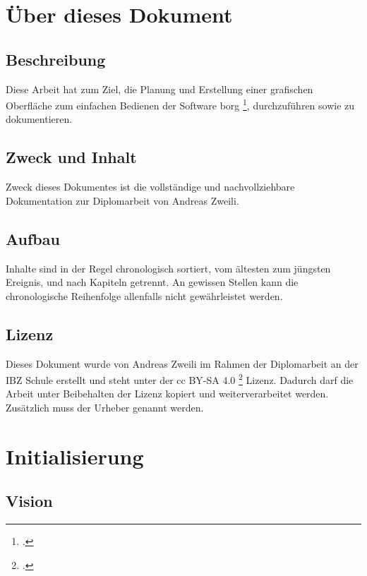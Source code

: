 
\section{Über dieses Dokument}
\label{sec:orgcce6e7f}

\subsection{Beschreibung}
\label{sec:org2668df1}

Diese Arbeit hat zum Ziel, die Planung und Erstellung einer grafischen
Oberfläche zum einfachen Bedienen der Software \gls{borg} \footcite{borgbackup},
durchzuführen sowie zu dokumentieren.

\subsection{Zweck und Inhalt}
\label{sec:org74e290b}

Zweck dieses Dokumentes ist die vollständige und nachvollziehbare Dokumentation
zur Diplomarbeit von Andreas Zweili.

\subsection{Aufbau}
\label{sec:org3536775}

Inhalte sind in der Regel chronologisch sortiert, vom ältesten zum jüngsten
Ereignis, und nach Kapiteln getrennt. An gewissen Stellen kann die
chronologische Reihenfolge allenfalls nicht gewährleistet werden.

\subsection{Lizenz}
\label{sec:org3bc24f6}

Dieses Dokument wurde von Andreas Zweili im Rahmen der Diplomarbeit an der IBZ
Schule erstellt und steht unter der \gls{cc} BY-SA 4.0 \footcite{cc} Lizenz.
Dadurch darf die Arbeit unter Beibehalten der Lizenz kopiert und
weiterverarbeitet werden. Zusätzlich muss der Urheber genannt werden.

\section{Initialisierung}
\label{sec:orgdbad29f}
\subsection{Vision}
\label{sec:orgb4650e5}

